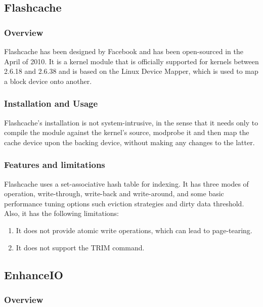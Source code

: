 \subsection{Flashcache}

\subsubsection{Overview}

Flashcache has been designed by Facebook and has been open-sourced in the April 
of 2010. It is a kernel module that is officially supported for kernels between  
2.6.18 and 2.6.38 and is based on the Linux Device Mapper, which is used to map 
a block device onto another.

\subsubsection{Installation and Usage}

Flashcache's installation is not system-intrusive, in the sense that it needs 
only to compile the module against the kernel's source, modprobe it and then 
map the cache device upon the backing device, without making any changes to the 
latter.

\subsubsection{Features and limitations}

Flashcache uses a set-associative hash table for indexing. It has three modes 
of operation, write-through, write-back and write-around, and some basic 
performance tuning options such eviction strategies and dirty data threshold.  
Also, it has the following limitations:

\begin{enumerate}
	\item It does not provide atomic write operations, which can lead to 
		page-tearing.
	\item It does not support the TRΙΜ command.
\end{enumerate}

\subsection{EnhanceIO}

\subsubsection{Overview}

